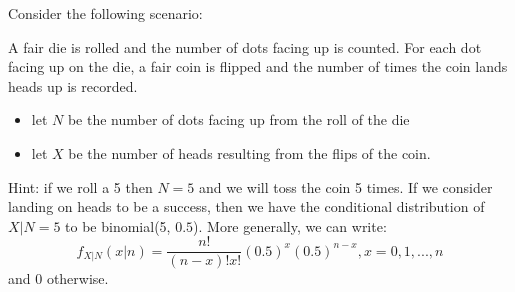 \documentclass[addpoints]{examsetup}\usepackage[]{graphicx}\usepackage[]{color}
\begin{document}
\begin{questions}
 
 \newpage
 
 \question
 
 Consider the following scenario:

 A fair die is rolled and the number of dots facing up is counted.
 For each dot facing up on the die, a fair coin is flipped and the number of times the coin lands heads up is recorded.
 \begin{itemize}
    \item let $N$ be the number of dots facing up from the roll of the die
    \item let $X$ be the number of heads resulting from the flips of the coin.
 \end{itemize}

 Hint: if we roll a 5 then $N = 5$ and we will toss the coin 5 times. If we consider landing on heads to be a success, then we have the conditional distribution of $X | N = 5$ to be binomial(5, $0.5$).
 More generally, we can write:
 $$
 f_{X|N}(x|n) = \frac{n!}{(n - x)! x!} (0.5)^x (0.5)^{n - x}, x = 0, 1, ..., n
 $$
 and 0 otherwise.
 
\end{questions}
\end{document}
